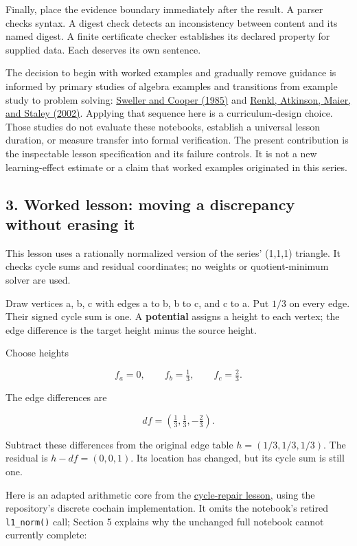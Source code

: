 \documentclass[
  11pt,
]{article}
\begin{document}
Finally, place the evidence boundary immediately after the result. A
parser checks syntax. A digest check detects an inconsistency between
content and its named digest. A finite certificate checker establishes
its declared property for supplied data. Each deserves its own sentence.

The decision to begin with worked examples and gradually remove guidance
is informed by primary studies of algebra examples and transitions from
example study to problem solving:
\href{https://www.tandfonline.com/doi/abs/10.1207/s1532690xci0201_3}{Sweller
and Cooper (1985)} and
\href{https://doi.org/10.1080/00220970209599510}{Renkl, Atkinson, Maier,
and Staley (2002)}. Applying that sequence here is a curriculum-design
choice. Those studies do not evaluate these notebooks, establish a
universal lesson duration, or measure transfer into formal verification.
The present contribution is the inspectable lesson specification and its
failure controls. It is not a new learning-effect estimate or a claim
that worked examples originated in this series.

\hypertarget{worked-lesson-moving-a-discrepancy-without-erasing-it}{%
\subsection{3. Worked lesson: moving a discrepancy without erasing
it}\label{worked-lesson-moving-a-discrepancy-without-erasing-it}}

This lesson uses a rationally normalized version of the series' (1,1,1)
triangle. It checks cycle sums and residual coordinates; no weights or
quotient-minimum solver are used.

Draw vertices a, b, c with edges a to b, b to c, and c to a. Put \(1/3\)
on every edge. Their signed cycle sum is one. A \textbf{potential}
assigns a height to each vertex; the edge difference is the target
height minus the source height.

Choose heights

\[
f_a=0,\qquad f_b=\tfrac13,\qquad f_c=\tfrac23.
\]

The edge differences are

\[
df=(\tfrac13,\tfrac13,-\tfrac23).
\]

Subtract these differences from the original edge table
\(h=(1/3,1/3,1/3)\). The residual is \(h-df=(0,0,1)\). Its location has
changed, but its cycle sum is still one.

Here is an adapted arithmetic core from the
\href{https://github.com/dbccpage/the_symbol_game/blob/52cb5457f6c485ba548cfd292f6012a941ed22cf/education/the_symbol_game/lessons/system_integration/100_novices/04_cycle_repair.ipynb}{cycle-repair
lesson}, using the repository's discrete cochain implementation. It
omits the notebook's retired \texttt{\nolinkurl{l1_norm()}} call;
Section 5 explains why the unchanged full notebook cannot currently
complete:
\end{document}
